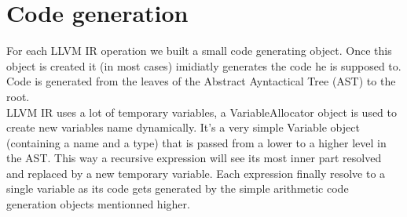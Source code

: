 \newpage\cleardoublepage{}
\section{Code generation}
 
For each LLVM IR operation we built a small code generating object. Once this object is created it (in most cases) imidiatly generates the code he is supposed to.
Code is generated from the leaves of the Abstract Ayntactical Tree (AST) to the root.\\ LLVM IR uses a lot of temporary variables, a VariableAllocator object is used to create new variables name dynamically.
It's a very simple Variable object (containing a name and a type) that is passed from a lower to a higher level in the AST.
This way a recursive expression will see its most inner part resolved and replaced by a new temporary variable. Each expression finally resolve to a single variable as its code gets generated by the simple arithmetic code generation objects mentionned higher.



